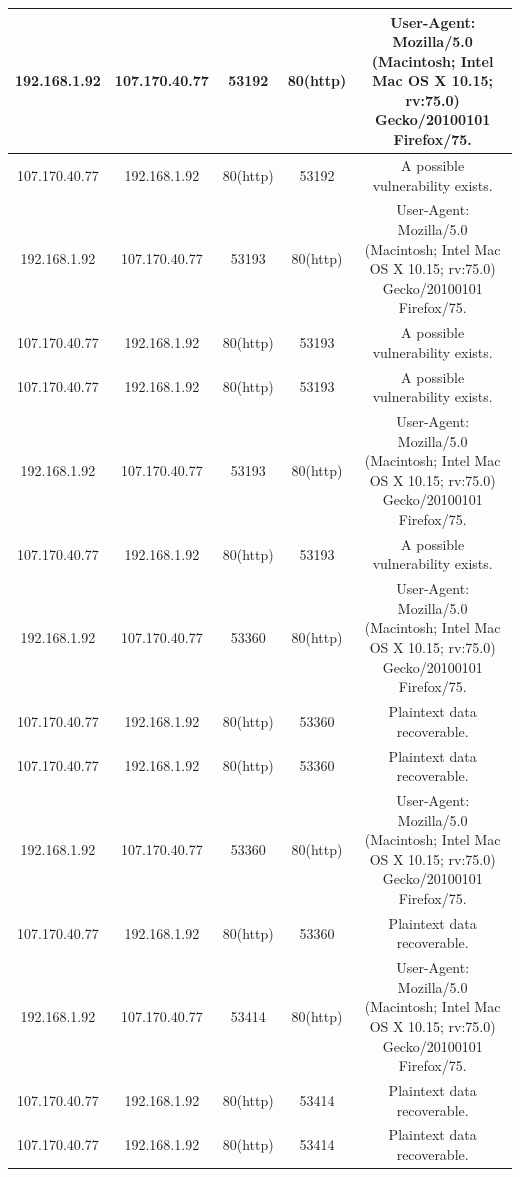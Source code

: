 \documentclass{article}
\begin{document}
\begin{center}
\begin{tabular}{||c c c c c||}
\hline
192.168.1.92 & 107.170.40.77 & 53192 & 80(http) & \multicolumn{1}{m{3cm}|}{User-Agent: Mozilla/5.0 (Macintosh; Intel Mac OS X 10.15; rv:75.0) Gecko/20100101 Firefox/75.}\\
\hline
107.170.40.77 & 192.168.1.92 & 80(http) & 53192 & \multicolumn{1}{m{3cm}|}{A possible vulnerability exists.}\\
\hline
192.168.1.92 & 107.170.40.77 & 53193 & 80(http) & \multicolumn{1}{m{3cm}|}{User-Agent: Mozilla/5.0 (Macintosh; Intel Mac OS X 10.15; rv:75.0) Gecko/20100101 Firefox/75.}\\
\hline
107.170.40.77 & 192.168.1.92 & 80(http) & 53193 & \multicolumn{1}{m{3cm}|}{A possible vulnerability exists.}\\
\hline
107.170.40.77 & 192.168.1.92 & 80(http) & 53193 & \multicolumn{1}{m{3cm}|}{A possible vulnerability exists.}\\
\hline
192.168.1.92 & 107.170.40.77 & 53193 & 80(http) & \multicolumn{1}{m{3cm}|}{User-Agent: Mozilla/5.0 (Macintosh; Intel Mac OS X 10.15; rv:75.0) Gecko/20100101 Firefox/75.}\\
\hline
107.170.40.77 & 192.168.1.92 & 80(http) & 53193 & \multicolumn{1}{m{3cm}|}{A possible vulnerability exists.}\\
\hline
192.168.1.92 & 107.170.40.77 & 53360 & 80(http) & \multicolumn{1}{m{3cm}|}{User-Agent: Mozilla/5.0 (Macintosh; Intel Mac OS X 10.15; rv:75.0) Gecko/20100101 Firefox/75.}\\
\hline
107.170.40.77 & 192.168.1.92 & 80(http) & 53360 & \multicolumn{1}{m{3cm}|}{Plaintext data recoverable.}\\
\hline
107.170.40.77 & 192.168.1.92 & 80(http) & 53360 & \multicolumn{1}{m{3cm}|}{Plaintext data recoverable.}\\
\hline
192.168.1.92 & 107.170.40.77 & 53360 & 80(http) & \multicolumn{1}{m{3cm}|}{User-Agent: Mozilla/5.0 (Macintosh; Intel Mac OS X 10.15; rv:75.0) Gecko/20100101 Firefox/75.}\\
\hline
107.170.40.77 & 192.168.1.92 & 80(http) & 53360 & \multicolumn{1}{m{3cm}|}{Plaintext data recoverable.}\\
\hline
192.168.1.92 & 107.170.40.77 & 53414 & 80(http) & \multicolumn{1}{m{3cm}|}{User-Agent: Mozilla/5.0 (Macintosh; Intel Mac OS X 10.15; rv:75.0) Gecko/20100101 Firefox/75.}\\
\hline
107.170.40.77 & 192.168.1.92 & 80(http) & 53414 & \multicolumn{1}{m{3cm}|}{Plaintext data recoverable.}\\
\hline
107.170.40.77 & 192.168.1.92 & 80(http) & 53414 & \multicolumn{1}{m{3cm}|}{Plaintext data recoverable.}\\

\end{tabular}
\end{center}
\end{document}
